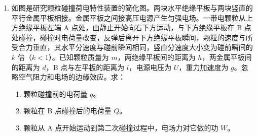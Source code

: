 \documentclass[\gkver]{gaokaozhenti}
\begin{document}
\begin{enumerate}
{（2）根据题意画出木塞摩擦力与运动距离的关系图如图所示。

\onepicture[w=3.50cm]{}

可得摩擦力对木塞所做的功为 $W_{f} = - \frac{1}{2}f_{0}h$

对木塞，根据动能定理

$W + W_{f} - mgh - \Delta pSh = \frac{1}{2}mv^{2} - 0$

解得 $W = mah + mgh + \frac{1}{2}f_{0}h + \Delta pSh$

（3）设开瓶器对木塞的作用力为 $F$，对木塞，根据牛顿第二定律 $F - mg - f - \Delta pS = ma$

速度 $v = at$

位移 $x = \frac{1}{2}at^{2}$

开瓶器的功率 $P = Fv$

联立可得 $P = magt + ma^{2}t + \Delta pSat + f_{0}at - \frac{f_{0}a^{2}t^{3}}{2h}$
}

\item
如图是研究颗粒碰撞荷电特性装置的简化图。两块水平绝缘平板与两块竖直的平行金属平板相接。金属平板之间接高压电源产生匀强电场。一带电颗粒从上方绝缘平板左端 A 点处，由静止开始向右下方运动，与下方绝缘平板在 B 点处碰撞，碰撞时电荷量改变，反弹后离开下方绝缘平板瞬间，颗粒的速度与所受合力垂直，其水平分速度与碰前瞬间相同，竖直分速度大小变为碰前瞬间的 $k$ 倍（$k < 1$）。已知颗粒质量为 $m$，两绝缘平板间的距离为 $h$，两金属平板间的距离为 $d$，B 点与左平板的距离为 $l$，电源电压为 $U$，重力加速度为 $g$。忽略空气阻力和电场的边缘效应。求：

\begin{enumerate}
\item
颗粒碰撞前的电荷量 $q$。
\item
颗粒在 B 点碰撞后的电荷量 $Q$。
\item
颗粒从 A 点开始运动到第二次碰撞过程中，电场力对它做的功 $W$。
\end{enumerate}


\end{enumerate}
\end{document}
